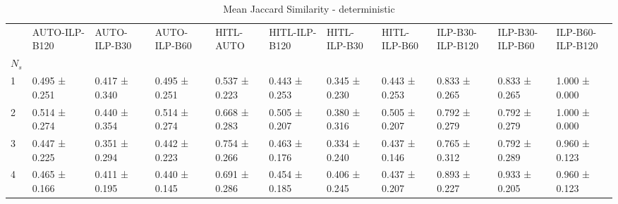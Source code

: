 \begin{table}
\caption{Mean Jaccard Similarity - deterministic}
\label{tab:jaccard_similarity_deterministic}
\begin{tabular}{lllllllllll}
\toprule
 & AUTO-ILP-B120 & AUTO-ILP-B30 & AUTO-ILP-B60 & HITL-AUTO & HITL-ILP-B120 & HITL-ILP-B30 & HITL-ILP-B60 & ILP-B30-ILP-B120 & ILP-B30-ILP-B60 & ILP-B60-ILP-B120 \\
$N_s$ &  &  &  &  &  &  &  &  &  &  \\
\midrule
1 & 0.495 ± 0.251 & 0.417 ± 0.340 & 0.495 ± 0.251 & 0.537 ± 0.223 & 0.443 ± 0.253 & 0.345 ± 0.230 & 0.443 ± 0.253 & 0.833 ± 0.265 & 0.833 ± 0.265 & 1.000 ± 0.000 \\
2 & 0.514 ± 0.274 & 0.440 ± 0.354 & 0.514 ± 0.274 & 0.668 ± 0.283 & 0.505 ± 0.207 & 0.380 ± 0.316 & 0.505 ± 0.207 & 0.792 ± 0.279 & 0.792 ± 0.279 & 1.000 ± 0.000 \\
3 & 0.447 ± 0.225 & 0.351 ± 0.294 & 0.442 ± 0.223 & 0.754 ± 0.266 & 0.463 ± 0.176 & 0.334 ± 0.240 & 0.437 ± 0.146 & 0.765 ± 0.312 & 0.792 ± 0.289 & 0.960 ± 0.123 \\
4 & 0.465 ± 0.166 & 0.411 ± 0.195 & 0.440 ± 0.145 & 0.691 ± 0.286 & 0.454 ± 0.185 & 0.406 ± 0.245 & 0.437 ± 0.207 & 0.893 ± 0.227 & 0.933 ± 0.205 & 0.960 ± 0.123 \\
\bottomrule
\end{tabular}
\end{table}
